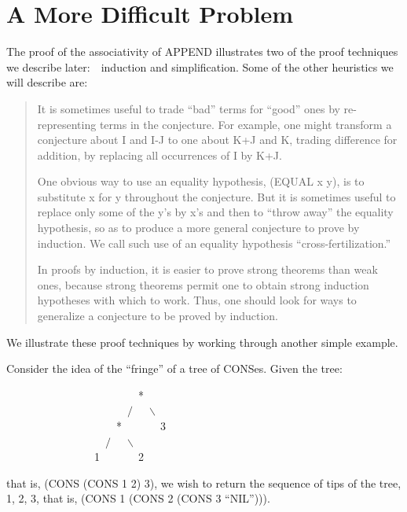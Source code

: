 \documentclass[11pt]{book}
\newenvironment{pubasis}{\begin{flushleft}\ttfamily\small}{\normalsize\rmfamily\end{flushleft}}
\newenvironment{pubcrown}{\begin{quote}}{\end{quote}}
\newcommand{\pubdefaulttextsize}{\large}
\begin{document}
\section{A More Difficult Problem}
\pubdefaulttextsize
The proof of the associativity of APPEND illustrates two of
the proof techniques we describe later:~~induction and
simplification.  Some of the other heuristics we will describe are:
\begin{pubcrown}
It is sometimes useful to trade ``bad'' terms for ``good'' ones by
re-representing terms in the conjecture.  For example,
one might transform a conjecture about
I and I-J to one about K+J and K, trading difference for addition, by
replacing all occurrences of I by K+J.

One obvious way to use an equality hypothesis, (EQUAL x y),
is to substitute x for y throughout the conjecture.  But it is sometimes useful to
replace only some of the y's by x's and then to ``throw away'' the
equality hypothesis, so as to produce a more general conjecture to
prove by induction.  We call such use of an equality hypothesis ``cross-fertilization.''

In proofs by induction, it is
easier to prove strong theorems than weak ones, because strong
theorems permit one to obtain strong induction hypotheses with which to
work.  Thus, one should look for ways to generalize a conjecture
to be proved by induction.
\end{pubcrown}
We illustrate these proof techniques by working through another
simple example.

Consider the idea of the ``fringe''   of a tree of CONSes.
Given the tree:
\begin{pubasis}
~~~~~~~~~~~~~~~~~~~~~~~~*\\
~~~~~~~~~~~~~~~~~~~~~~$/$~~~$\backslash$\\
~~~~~~~~~~~~~~~~~~~~*~~~~~~~3\\
~~~~~~~~~~~~~~~~~~$/$~~~$\backslash$\\
~~~~~~~~~~~~~~~~1~~~~~~~2\\
\end{pubasis}
that is, (CONS (CONS 1 2) 3), we wish to return the sequence of tips of the tree,
1, 2, 3, that is, (CONS 1 (CONS 2 (CONS 3 ``NIL''))).
\end{document}
